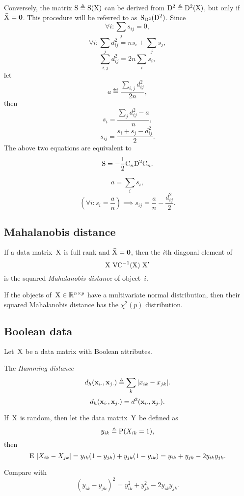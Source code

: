 \documentclass[10pt,a4paper]{article}
\theoremstyle{plain} \newtheorem{Lem}{Lemma}
\begin{document}
Conversely, the matrix $\mathrm S \triangleq \mathrm S (\mathrm X)$ can be derived from $\mathrm D^2 \triangleq \mathrm D^2(\mathrm X)$,
but only if $\bar {\mathrm X} = \mathbf 0$.
This procedure will be referred to as~$\mathrm S_{\mathrm D^2}(\mathrm D^2)$.
Since
$$ \forall i : \sum_j s_{ij} = 0, $$
$$ \forall i : \sum_j d^2_{ij} = n s_i + \sum_j s_j, $$
$$ \sum_{i,j} d^2_{ij} = 2 n \sum_i s_i, $$
let
$$ a \eqdef \frac {\sum_{i,j} d^2_{ij}} {2n}, $$
then
$$ s_i = \frac {\sum_j d^2_{ij} - a} n, $$
$$ s_{ij} = \frac {s_i + s_j - d^2_{ij}} 2. $$
The above two equations are equivalent to
$$ \mathrm S = - \frac 1 2 \mathrm C_n \mathrm D^2 \mathrm C_n. $$

$$ a = \sum_i s_i, $$
$$ \left(\forall i : s_i = \frac a n \right) \implies s_{ij} = \frac a n - \frac {d^2_{ij}} 2. $$


\subsection{Mahalanobis distance}
If a data matrix~$\mathrm X$ is full rank and $\bar {\mathrm X} = \mathbf 0$, 
then the $i$th diagonal element of 
\begin{equation} \label{mahalanobis}
\mathrm X \ \mathrm {VC}^{-1}(\mathrm X) \ \mathrm X'
\end{equation}
is the squared {\em Mahalanobis distance} of object~$i$.

If the objects of~$\mathrm X \in \mathbb R^{n \times p}$ have a multivariate normal distribution, then their squared Mahalanobis distance has the $\chi^2(p)$ distribution.


\subsection{Boolean data}
Let~$\mathrm X$ be a data matrix with Boolean attributes.

The {\em Hamming distance} 
$$ d_h(\mathbf x_{i\cdot}, \mathbf x_{j\cdot}) \triangleq \sum_k |x_{ik} - x_{jk}|. $$
$$ d_h(\mathbf x_{i\cdot}, \mathbf x_{j\cdot}) = d^2 (\mathbf x_{i\cdot}, \mathbf x_{j\cdot}). $$

If~$\mathrm X$ is random, then let the data matrix~$\mathrm Y$ be defined as
$$ y_{ik} \triangleq \mathrm P (X_{ik} = 1), $$
then
$$ \mathrm E \  |X_{ik} - X_{jk}|
    =   y_{ik} (1 - y_{jk}) 
      + y_{jk} (1 - y_{ik}) 
    =   y_{ik}  + y_{jk} - 2 y_{ik} y_{jk}.
$$

Compare with
$$ (y_{ik} - y_{jk})^2 = y^2_{ik} + y^2_{jk} - 2 y_{ik} y_{jk}. $$
\end{document}
